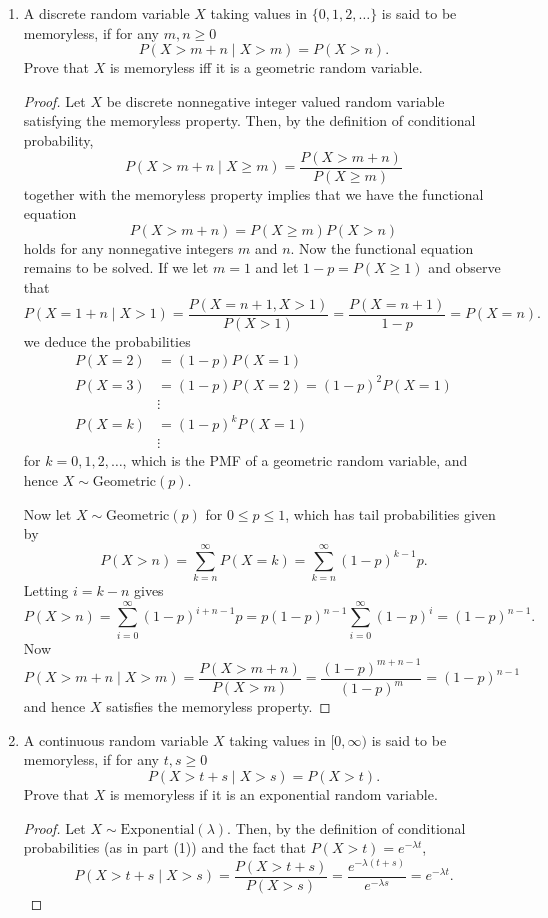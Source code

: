 \documentclass[oneside,reqno]{amsart}
\newcommand{\Exp}{\mathrm{Exponential}}
\newcommand{\Geom}{\mathrm{Geometric}}
\theoremstyle{definition}
\begin{document}
\begin{enumerate}
\item
A discrete random variable $X$ taking values in $\{0, 1, 2, \dotsc \}$ is said to be memoryless, if for any $m, n \geq 0$
\[	
	P(X > m + n \mid X > m) = P(X > n).
\]
Prove that $X$ is memoryless iff it is a geometric random variable.
\begin{proof}
Let $X$ be discrete nonnegative integer valued random variable satisfying the memoryless property. Then, by the definition of conditional probability,
\[
	P(X > m + n \mid X \geq m) = \frac{P(X>m + n)}{P(X \geq m)}
\]
together with the memoryless property implies that we have the functional equation
\[
	P(X > m + n) = P(X \geq m)P(X > n)
\] 
holds for any nonnegative integers $m$ and $n$. Now the functional equation remains to be solved. If we let $m=1$ and let $1-p = P(X \geq 1)$ and observe that 
\[
	P(X = 1+n \mid X > 1) =  \frac{P(X  =  n + 1, X > 1)}{P(X > 1)}  = \frac{P(X =n+1)}{1-p}  = P(X = n).
\]
we deduce the probabilities 
\begin{align*}
	P(X=2) &= (1-p) P(X=1) \\
	P(X=3) &= (1-p)P(X=2) = (1-p)^2 P(X=1) \\
	& \vdots \\ 
	P(X=k) &= (1-p)^k P(X=1) \\
	& \vdots 
\end{align*}	
for $k=0,1,2,\dotsc$, which is the PMF of a geometric random variable, and hence $X \sim \Geom(p)$. 
\par
Now let $X \sim \Geom(p)$ for $0 \leq p \leq 1$, which has tail probabilities given by
\[
	P(X > n) = \sum_{k=n}^\infty P(X = k) = \sum_{k=n}^\infty (1 - p)^{k-1} p.
\]
Letting $i=k-n$ gives
\[
	P(X > n) = \sum_{i=0}^\infty (1 - p)^{i+n-1} p = p(1-p)^{n-1} \sum_{i=0}^\infty (1 - p)^i = (1-p)^{n-1}.
\]
Now 
\[
	P(X > m + n \mid X > m)= \frac{P(X>m + n)}{P(X > m)} = \frac{(1-p)^{m+n-1}}{(1-p)^{m}} = (1-p)^{n-1}
\]
and hence $X$ satisfies the memoryless property. 
\end{proof}

\item
A continuous random variable $X$ taking values in $[0, \infty)$ is said to be memoryless, if for any $t,s\geq 0$ 
\[
	P(X > t + s \mid X > s) = P(X > t).
\]
Prove that $X$ is memoryless if it is an exponential random variable. 
\begin{proof}
Let $X \sim \Exp(\lambda)$. Then, by the definition of conditional probabilities (as in part (1)) and the fact that $P(X>t) = e^{-\lambda t}$, 
\[
	P(X> t+s \mid X > s) =  \frac{P(X > t+s)}{P(X > s)} = \frac{e^{-\lambda(t+s)}}{e^{-\lambda s}} = e^{-\lambda t}.
\]
\end{proof}


\end{enumerate}
\end{document}
